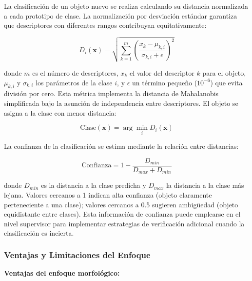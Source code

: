 La clasificación de un objeto nuevo se realiza calculando su distancia normalizada a cada prototipo de clase. La normalización por desviación estándar garantiza que descriptores con diferentes rangos contribuyan equitativamente:

\begin{equation}
D_i(\mathbf{x}) = \sqrt{\sum_{k=1}^{m} \left(\frac{x_k - \mu_{k,i}}{\sigma_{k,i} + \epsilon}\right)^2}
\end{equation}

donde $m$ es el número de descriptores, $x_k$ el valor del descriptor $k$ para el objeto, $\mu_{k,i}$ y $\sigma_{k,i}$ los parámetros de la clase $i$, y $\epsilon$ un término pequeño ($10^{-6}$) que evita división por cero. Esta métrica implementa la distancia de Mahalanobis simplificada bajo la asunción de independencia entre descriptores. El objeto se asigna a la clase con menor distancia:

\begin{equation}
\text{Clase}(\mathbf{x}) = \arg\min_{i} D_i(\mathbf{x})
\end{equation}

La confianza de la clasificación se estima mediante la relación entre distancias:

\begin{equation}
\text{Confianza} = 1 - \frac{D_{min}}{D_{max} + D_{min}}
\end{equation}

donde $D_{min}$ es la distancia a la clase predicha y $D_{max}$ la distancia a la clase más lejana. Valores cercanos a 1 indican alta confianza (objeto claramente perteneciente a una clase); valores cercanos a 0.5 sugieren ambigüedad (objeto equidistante entre clases). Esta información de confianza puede emplearse en el nivel supervisor para implementar estrategias de verificación adicional cuando la clasificación es incierta.

\subsubsection{Ventajas y Limitaciones del Enfoque}

\textbf{Ventajas del enfoque morfológico:}

